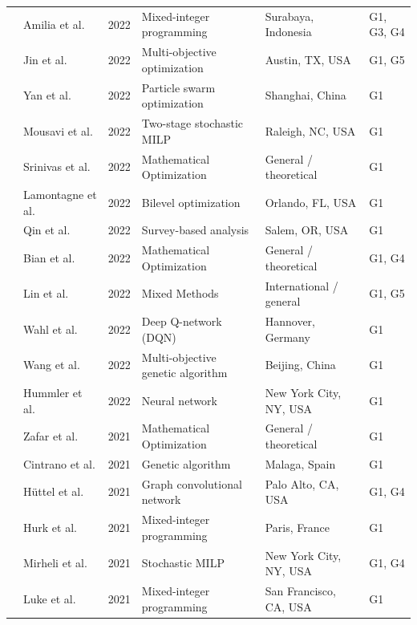 \documentclass[letterpaper, 12pt, oneside, doublespacing]{Thesis}
\begin{document}
\begin{longtable}{L{0.9cm} L{2.2cm} L{0.8cm} L{3.3cm} L{2.5cm} L{1.5cm}}
\cite{designing_an_2022} & Amilia et al. & 2022 & Mixed-integer programming & Surabaya, Indonesia & G1, G3, G4 \\
\cite{development_of_2022} & Jin et al. & 2022 & Multi-objective optimization & Austin, TX, USA & G1, G5 \\
\cite{distributed_coordination_2022} & Yan et al. & 2022 & Particle swarm optimization & Shanghai, China & G1 \\
\cite{ev_charging_2022} & Mousavi et al. & 2022 & Two-stage stochastic MILP & Raleigh, NC, USA & G1 \\
\cite{optimal_placement_2022} & Srinivas et al. & 2022 & Mathematical Optimization & General {\slash} theoretical & G1 \\
\cite{optimising_electric_2022} & Lamontagne et al. & 2022 & Bilevel optimization & Orlando, FL, USA & G1 \\
\cite{performance_analysis_2022} & Qin et al. & 2022 & Survey-based analysis & Salem, OR, USA & G1 \\
\cite{planning_of_2022} & Bian et al. & 2022 & Mathematical Optimization & General {\slash} theoretical & G1, G4 \\
\cite{predictive_energy_2022} & Lin et al. & 2022 & Mixed Methods & International {\slash} general & G1, G5 \\
\cite{reinforcement_learning-based_2022} & Wahl et al. & 2022 & Deep Q-network (DQN) & Hannover, Germany & G1 \\
\cite{research_on_2022} & Wang et al. & 2022 & Multi-objective genetic algorithm & Beijing, China & G1 \\
\cite{web_mining_2022} & Hummler et al. & 2022 & Neural network & New York City, NY, USA & G1 \\
\cite{a_gis-based_2021} & Zafar et al. & 2021 & Mathematical Optimization & General {\slash} theoretical & G1 \\
\cite{citizen_centric_2021} & Cintrano et al. & 2021 & Genetic algorithm & Malaga, Spain & G1 \\
\cite{deep_spatio-temporal_2021} & H\"uttel et al. & 2021 & Graph convolutional network & Palo Alto, CA, USA & G1, G4 \\
\cite{energy-optimal_design_2021} & Hurk et al. & 2021 & Mixed-integer programming & Paris, France & G1 \\
\cite{hierarchical_optimization_2021} & Mirheli et al. & 2021 & Stochastic MILP & New York City, NY, USA & G1, G4 \\
\cite{joint_optimization_2021} & Luke et al. & 2021 & Mixed-integer programming & San Francisco, CA, USA & G1 \\

\end{longtable}
\end{document}
